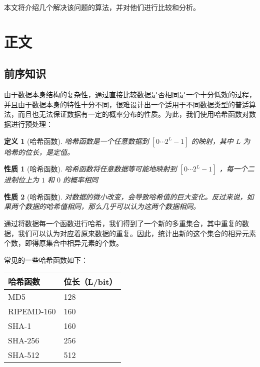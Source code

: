 \documentclass{ctexart}
\newtheorem{definition}{\hspace{2em} 定义}[subsection]
\newtheorem{property}{\hspace{2em} 性质}[subsection]
\begin{document}
    本文将介绍几个解决该问题的算法，并对他们进行比较和分析。
\section{正文}
\subsection{前序知识}
    由于数据本身结构的复杂性，通过直接比较数据是否相同是一个十分低效的过程，并且由于数据本身的特性十分不同，很难设计出一个适用于不同数据类型的普适算法，而且也无法保证数据有一定的概率分布的性质。为此，我们使用哈希函数对数据进行预处理：

    \begin{definition}[哈希函数]
        哈希函数是一个任意数据到 $[0 \cdots 2^L-1]$ 的映射，其中 $L$ 为哈希的位长，是定值。
    \end{definition}

    \begin{property}[哈希函数]
        哈希函数将任意数据等可能地映射到 $[0 \cdots 2^L-1]$ ，每一个二进制位上为 $1$ 和 $0$ 的概率相同
    \end{property}

    \begin{property}[哈希函数]
        对数据的微小改变，会导致哈希值的巨大变化。反过来说，如果两个数据的哈希值相同，那么几乎可以认为这两个数据相同。
    \end{property}

    通过将数据每一个函数进行哈希，我们得到了一个新的多重集合，其中重复的数据，我们可以认为对应着原来数据的重复。因此，统计出新的这个集合的相异元素个数，即得原集合中相异元素的个数。

    常见的一些哈希函数如下：

    \begin{center}
        \begin{tabular}{|l|l|}
            \hline
            哈希函数 & 位长（L/bit）\\
            \hline
            MD5 & 128 \\
            \hline
            RIPEMD-160 & 160 \\
            \hline
            SHA-1 & 160 \\
            \hline
            SHA-256 & 256 \\
            \hline
            SHA-512 & 512 \\
            \hline
        \end{tabular}
    \end{center}
\end{document}
